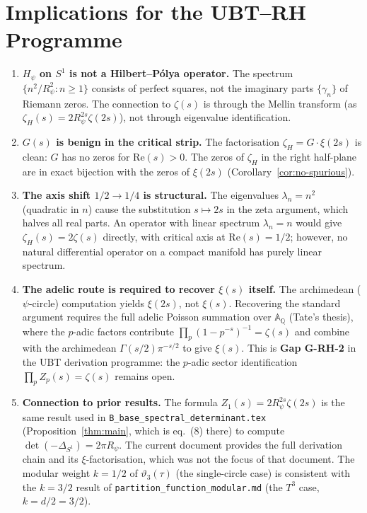 \documentclass[11pt,a4paper]{article}
\theoremstyle{definition}
\theoremstyle{remark}
\newcommand{\Rp}{R_{\psi}}
\newcommand{\Gam}{\Gamma}
\newcommand{\Hp}{H_{\psi}}
\begin{document}
\section{Implications for the UBT--RH Programme}
\label{sec:implications}

\begin{enumerate}

\item \textbf{$\Hp$ on $S^1$ is not a Hilbert--Pólya operator.}
      The spectrum $\{n^2/\Rp^2 : n \geq 1\}$ consists of perfect squares,
      not the imaginary parts $\{\gamma_n\}$ of Riemann zeros.
      The connection to $\zeta(s)$ is through the Mellin transform
      (as $\zeta_H(s) = 2\Rp^{2s}\zeta(2s)$), not through eigenvalue
      identification.

\item \textbf{$G(s)$ is benign in the critical strip.}
      The factorisation $\zeta_H = G\cdot\xi(2s)$ is clean: $G$ has no
      zeros for $\mathrm{Re}(s)>0$.  The zeros of $\zeta_H$ in the right
      half-plane are in exact bijection with the zeros of $\xi(2s)$
      (Corollary~\ref{cor:no-spurious}).

\item \textbf{The axis shift $1/2 \to 1/4$ is structural.}
      The eigenvalues $\lambda_n = n^2$ (quadratic in $n$) cause the
      substitution $s \mapsto 2s$ in the zeta argument, which halves
      all real parts.  An operator with linear spectrum $\lambda_n = n$
      would give $\zeta_H(s) = 2\zeta(s)$ directly, with critical axis
      at $\mathrm{Re}(s)=1/2$; however, no natural differential operator
      on a compact manifold has purely linear spectrum.

\item \textbf{The adelic route is required to recover $\xi(s)$ itself.}
      The archimedean ($\psi$-circle) computation yields $\xi(2s)$,
      not $\xi(s)$.  Recovering the standard argument requires the
      full adelic Poisson summation over $\mathbb{A}_\mathbb{Q}$
      (Tate's thesis), where the $p$-adic factors contribute
      $\prod_p (1-p^{-s})^{-1} = \zeta(s)$ and combine with the
      archimedean $\Gam(s/2)\pi^{-s/2}$ to give $\xi(s)$.
      This is \textbf{Gap G-RH-2} in the UBT derivation programme:
      the $p$-adic sector identification $\prod_p Z_p(s) = \zeta(s)$
      remains open.

\item \textbf{Connection to prior results.}
      The formula $Z_1(s) = 2\Rp^{2s}\zeta(2s)$ is the same result used
      in \texttt{B\_base\_spectral\_determinant.tex} (Proposition~\ref{thm:main},
      which is eq.~(8) there) to compute
      $\det(-\Delta_{S^1}) = 2\pi\Rp$.  The current document provides the
      full derivation chain and its $\xi$-factorisation, which was not
      the focus of that document.  The modular weight $k=1/2$ of
      $\vartheta_3(\tau)$ (the single-circle case) is consistent with
      the $k=3/2$ result of \texttt{partition\_function\_modular.md}
      (the $T^3$ case, $k = d/2 = 3/2$).
\end{enumerate}
\end{document}
